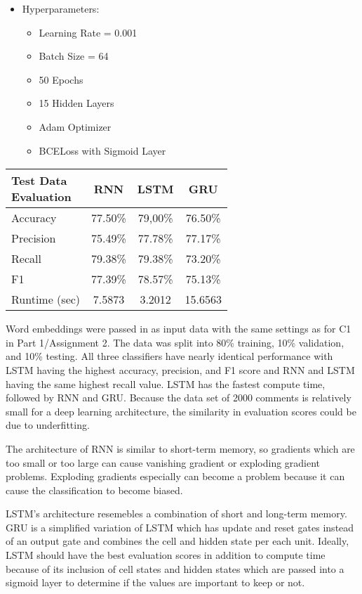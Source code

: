 \documentclass[conference]{IEEEtran}
\begin{document}
\begin{multicols}{2}
\begin{itemize}
\item Hyperparameters:
\begin{itemize}
\item Learning Rate = 0.001
\item Batch Size = 64
\item 50 Epochs
\item 15 Hidden Layers
\item Adam Optimizer
\item BCELoss with Sigmoid Layer
\end{itemize}
\end{itemize}
\columnbreak
\begin{table}[H]
    \centering
    \begin{tabular}{|l|c|c|c|}
        \hline
        \makecell{Test Data\\ Evaluation} & RNN & LSTM & GRU \\
        \hline
        Accuracy  	  & 77.50\% & 79,00\% & 76.50\% \\
        Precision 	  & 75.49\% & 77.78\% & 77.17\% \\
        Recall        & 79.38\% & 79.38\% & 73.20\% \\
        F1       	  & 77.39\% & 78.57\% & 75.13\% \\
        Runtime (sec) & 7.5873 & 3.2012 & 15.6563 \\
        \hline
    \end{tabular}
\end{table}
\end{multicols}
\par Word embeddings were passed in as input data with the same settings as for C1 in Part 1/Assignment 2. The data was split into 80\% training, 10\% validation, and 10\% testing. All three classifiers have nearly identical performance with LSTM having the highest accuracy, precision, and F1 score and RNN and LSTM having the same highest recall value. LSTM has the fastest compute time, followed by RNN and GRU. Because the data set of 2000 comments is relatively small for a deep learning architecture, the similarity in evaluation scores could be due to underfitting.
\par The architecture of RNN is similar to short-term memory, so gradients which are too small or too large can cause vanishing gradient or exploding gradient problems. Exploding gradients especially can become a problem because it can cause the classification to become biased.
\par LSTM's architecture resemebles a combination of short and long-term memory. GRU is a simplified variation of LSTM which has update and reset gates instead of an output gate and combines the cell and hidden state per each unit. Ideally, LSTM should have the best evaluation scores in addition to compute time because of its inclusion of cell states and hidden states which are passed into a sigmoid layer to determine if the values are important to keep or not.
\end{document}

